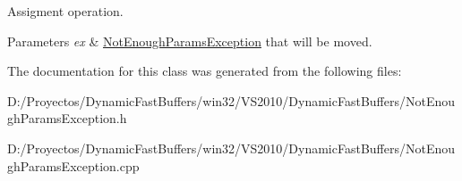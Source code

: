 Assigment operation. 


\begin{DoxyParams}{Parameters}
{\em ex} & \hyperlink{class_dynamic_fast_buffers_1_1_not_enough_params_exception}{Not\-Enough\-Params\-Exception} that will be moved. \\
\hline
\end{DoxyParams}


The documentation for this class was generated from the following files\-:\begin{DoxyCompactItemize}
\item 
D\-:/\-Proyectos/\-Dynamic\-Fast\-Buffers/win32/\-V\-S2010/\-Dynamic\-Fast\-Buffers/Not\-Enough\-Params\-Exception.\-h\item 
D\-:/\-Proyectos/\-Dynamic\-Fast\-Buffers/win32/\-V\-S2010/\-Dynamic\-Fast\-Buffers/Not\-Enough\-Params\-Exception.\-cpp\end{DoxyCompactItemize}
